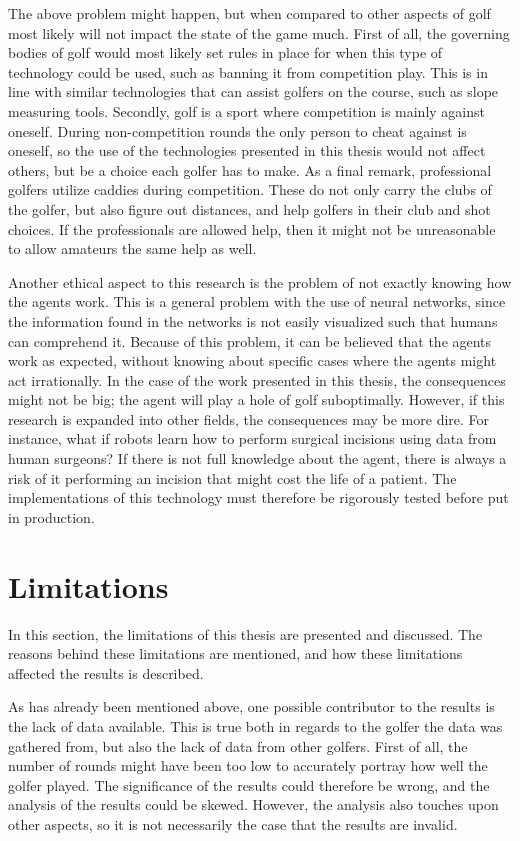 \documentclass{kththesis}
\begin{document}
The above problem might happen, but when compared to other aspects of golf most likely will not impact the state of the game much. First of all, the governing bodies of golf would most likely set rules in place for when this type of technology could be used, such as banning it from competition play. This is in line with similar technologies that can assist golfers on the course, such as slope measuring tools. Secondly, golf is a sport where competition is mainly against oneself. During non-competition rounds the only person to cheat against is oneself, so the use of the technologies presented in this thesis would not affect others, but be a choice each golfer has to make. As a final remark, professional golfers utilize caddies during competition. These do not only carry the clubs of the golfer, but also figure out distances, and help golfers in their club and shot choices. If the professionals are allowed help, then it might not be unreasonable to allow amateurs the same help as well.

Another ethical aspect to this research is the problem of not exactly knowing how the agents work. This is a general problem with the use of neural networks, since the information found in the networks is not easily visualized such that humans can comprehend it. Because of this problem, it can be believed that the agents work as expected, without knowing about specific cases where the agents might act irrationally. In the case of the work presented in this thesis, the consequences might not be big; the agent will play a hole of golf suboptimally. However, if this research is expanded into other fields, the consequences may be more dire. For instance, what if robots learn how to perform surgical incisions using data from human surgeons? If there is not full knowledge about the agent, there is always a risk of it performing an incision that might cost the life of a patient. The implementations of this technology must therefore be rigorously tested before put in production.

\section{Limitations}
In this section, the limitations of this thesis are presented and discussed. The reasons behind these limitations are mentioned, and how these limitations affected the results is described.

As has already been mentioned above, one possible contributor to the results is the lack of data available. This is true both in regards to the golfer the data was gathered from, but also the lack of data from other golfers. First of all, the number of rounds might have been too low to accurately portray how well the golfer played. The significance of the results could therefore be wrong, and the analysis of the results could be skewed. However, the analysis also touches upon other aspects, so it is not necessarily the case that the results are invalid.
\end{document}
